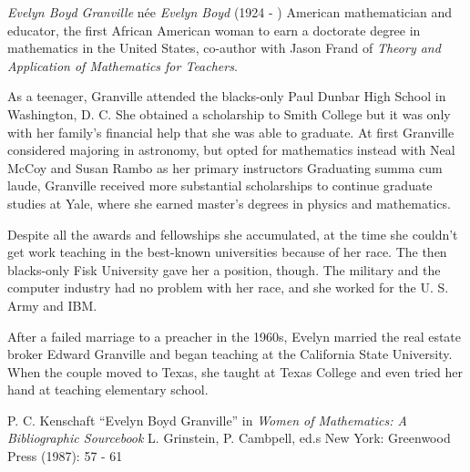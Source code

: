 \documentclass[12pt]{article}
\begin{document}
\emph{Evelyn Boyd Granville} n\'ee \emph{Evelyn Boyd} (1924 - ) American mathematician and educator, the first African American woman to earn a doctorate degree in mathematics in the United States, co-author with Jason Frand of {\it Theory and Application of Mathematics for Teachers}.

As a teenager, Granville attended the blacks-only Paul Dunbar High School in Washington, D. C. She obtained a scholarship to Smith College but it was only with her family's financial help that she was able to graduate. At first Granville considered majoring in astronomy, but opted for mathematics instead with Neal McCoy and Susan Rambo as her primary instructors Graduating summa cum laude, Granville received more substantial scholarships to continue graduate studies at Yale, where she earned master's degrees in physics and mathematics.

Despite all the awards and fellowships she accumulated, at the time she couldn't get work teaching in the best-known universities because of her race. The then blacks-only Fisk University gave her a position, though. The military and the computer industry had no problem with her race, and she worked for the U. S. Army and IBM.

After a failed marriage to a preacher in the 1960s, Evelyn married the real estate broker Edward Granville and began teaching at the California State University. When the couple moved to Texas, she taught at Texas College and even tried her hand at teaching elementary school.

\begin{thebibliography}{1}
 P. C. Kenschaft ``Evelyn Boyd Granville'' in {\it Women of Mathematics: A Bibliographic Sourcebook} L. Grinstein, P. Cambpell, ed.s New York: Greenwood Press (1987): 57 - 61
\end{thebibliography}
\end{document}
